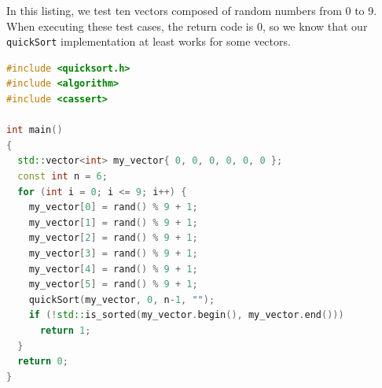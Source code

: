 In this listing, we test ten vectors composed of random numbers from 0 to 9. When executing these test cases, the return code is 0, so we know that our \verb|quickSort| implementation at least works for some vectors.

\begin{lstlisting}[language=C++, caption={Test cases for quickSort}, frame=p, label={lst:quicksortTests}]
#include <quicksort.h>
#include <algorithm>
#include <cassert>

int main()
{
  std::vector<int> my_vector{ 0, 0, 0, 0, 0, 0 };
  const int n = 6;
  for (int i = 0; i <= 9; i++) {
    my_vector[0] = rand() % 9 + 1;
    my_vector[1] = rand() % 9 + 1;
    my_vector[2] = rand() % 9 + 1;
    my_vector[3] = rand() % 9 + 1;
    my_vector[4] = rand() % 9 + 1;
    my_vector[5] = rand() % 9 + 1;
    quickSort(my_vector, 0, n-1, "");
    if (!std::is_sorted(my_vector.begin(), my_vector.end()))
      return 1;
  }
  return 0;
}
\end{lstlisting}

